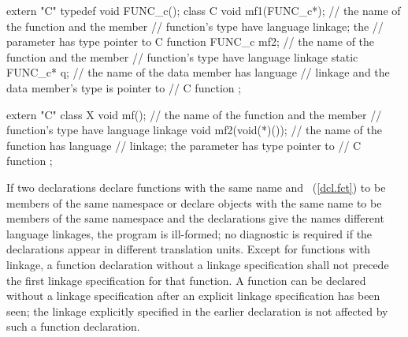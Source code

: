 \begin{codeblock}
extern "C" typedef void FUNC_c();
class C {
  void mf1(FUNC_c*);            // the name of the function  and the member
                                // function's type have \Cpp language linkage; the
                                // parameter has type pointer to C function
  FUNC_c mf2;                   // the name of the function  and the member
                                // function's type have \Cpp language linkage
  static FUNC_c* q;             // the name of the data member  has \Cpp language
                                // linkage and the data member's type is pointer to
                                // C function
};

extern "C" {
  class X {
    void mf();                  // the name of the function  and the member
                                // function's type have \Cpp language linkage
    void mf2(void(*)());        // the name of the function  has \Cpp language
                                // linkage; the parameter has type pointer to
                                // C function
  };
}
\end{codeblock}
\exitexample

\pnum
If two declarations declare functions with the same name and
~(\ref{dcl.fct}) to be members of the same
namespace or declare objects with the same name to be members of the same
namespace and the declarations give the names different language linkages, the
program is ill-formed; no diagnostic is required if the declarations appear in
different translation units.
%
Except for functions with \Cpp linkage, a function declaration without a
linkage specification shall not precede the first linkage specification
for that function. A function can be declared without a linkage
specification after an explicit linkage specification has been seen; the
linkage explicitly specified in the earlier declaration is not affected
by such a function declaration.

